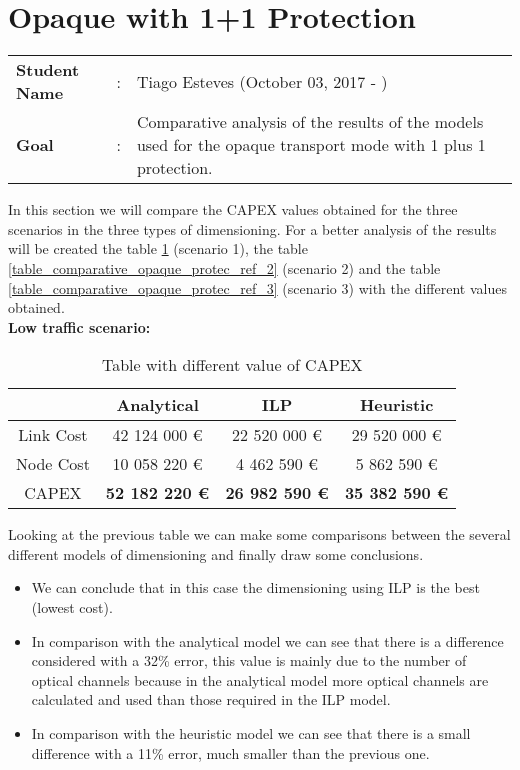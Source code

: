 \clearpage

\section{Opaque with 1+1 Protection}\label{comparative_Opaque_Protection}
\begin{tcolorbox}	
\begin{tabular}{p{2.75cm} p{0.2cm} p{10.5cm}} 	
\textbf{Student Name}  &:& Tiago Esteves    (October 03, 2017 - )\\
\textbf{Goal}          &:& Comparative analysis of the results of the models used for the opaque transport mode with 1 plus 1 protection.
\end{tabular}
\end{tcolorbox}
\vspace{11pt}


In this section we will compare the CAPEX values obtained for the three scenarios in the three types of dimensioning. For a better analysis of the results will be created the table \ref{table_comparative_opaque_protec_ref_1} (scenario 1), the table \ref{table_comparative_opaque_protec_ref_2} (scenario 2) and the table \ref{table_comparative_opaque_protec_ref_3} (scenario 3) with the different values obtained.\\

\textbf{Low traffic scenario:}

\begin{table}[h!]
\centering
\begin{tabular}{| c | c | c | c |}
 \hline
   & Analytical & ILP & Heuristic \\
 \hline\hline
 Link Cost & 42 124 000 \euro & 22 520 000 \euro & 29 520 000 \euro \\
 Node Cost & 10 058 220 \euro & 4 462 590 \euro & 5 862 590 \euro \\
 CAPEX & \textbf{52 182 220 \euro} & \textbf{26 982 590 \euro} & \textbf{35 382 590 \euro} \\
 \hline
\end{tabular}
\caption{Table with different value of CAPEX }
\label{table_comparative_opaque_protec_ref_1}
\end{table}

\vspace{11pt}
Looking at the previous table we can make some comparisons between the several different models of dimensioning and finally draw some conclusions.

\begin{itemize}
  \item We can conclude that in this case the dimensioning using ILP is the best (lowest cost).
  \item In comparison with the analytical model we can see that there is a difference considered with a 32\% error, this value is mainly due to the number of optical channels because in the analytical model more optical channels are calculated and used than those required in the ILP model.
  \item In comparison with the heuristic model we can see that there is a small difference with a 11\% error, much smaller than the previous one.
\end{itemize}

